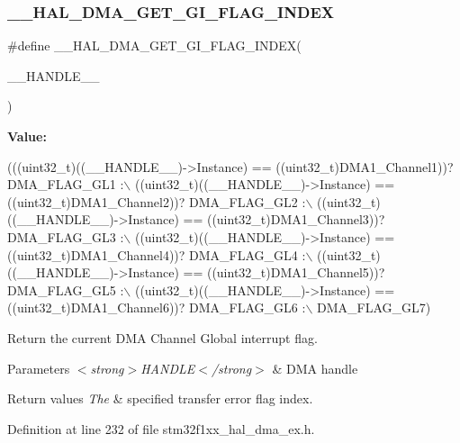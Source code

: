 \subsubsection{\texorpdfstring{\+\_\+\+\_\+\+H\+A\+L\+\_\+\+D\+M\+A\+\_\+\+G\+E\+T\+\_\+\+G\+I\+\_\+\+F\+L\+A\+G\+\_\+\+I\+N\+D\+EX}{\_\_HAL\_DMA\_GET\_GI\_FLAG\_INDEX}}
{\footnotesize\ttfamily \#define \+\_\+\+\_\+\+H\+A\+L\+\_\+\+D\+M\+A\+\_\+\+G\+E\+T\+\_\+\+G\+I\+\_\+\+F\+L\+A\+G\+\_\+\+I\+N\+D\+EX(\begin{DoxyParamCaption}\item[{}]{\+\_\+\+\_\+\+H\+A\+N\+D\+L\+E\+\_\+\+\_\+ }\end{DoxyParamCaption})}

{\bfseries Value\+:}
\begin{DoxyCode}
(((uint32\_t)((\_\_HANDLE\_\_)->Instance) == ((uint32\_t)DMA1\_Channel1))? DMA\_FLAG\_GL1 :\(\backslash\)
 ((uint32\_t)((\_\_HANDLE\_\_)->Instance) == ((uint32\_t)DMA1\_Channel2))? DMA\_FLAG\_GL2 :\(\backslash\)
 ((uint32\_t)((\_\_HANDLE\_\_)->Instance) == ((uint32\_t)DMA1\_Channel3))? DMA\_FLAG\_GL3 :\(\backslash\)
 ((uint32\_t)((\_\_HANDLE\_\_)->Instance) == ((uint32\_t)DMA1\_Channel4))? DMA\_FLAG\_GL4 :\(\backslash\)
 ((uint32\_t)((\_\_HANDLE\_\_)->Instance) == ((uint32\_t)DMA1\_Channel5))? DMA\_FLAG\_GL5 :\(\backslash\)
 ((uint32\_t)((\_\_HANDLE\_\_)->Instance) == ((uint32\_t)DMA1\_Channel6))? DMA\_FLAG\_GL6 :\(\backslash\)
   DMA\_FLAG\_GL7)
\end{DoxyCode}


Return the current D\+MA Channel Global interrupt flag. 


\begin{DoxyParams}{Parameters}
{\em $<$strong$>$\+H\+A\+N\+D\+L\+E$<$/strong$>$} & D\+MA handle \\
\hline
\end{DoxyParams}

\begin{DoxyRetVals}{Return values}
{\em The} & specified transfer error flag index. \\
\hline
\end{DoxyRetVals}


Definition at line 232 of file stm32f1xx\+\_\+hal\+\_\+dma\+\_\+ex.\+h.

\mbox{\label{group___d_m_a___low__density___medium__density___product__devices_ga0095f5f3166a82bedc67744ac94acfba}} 
